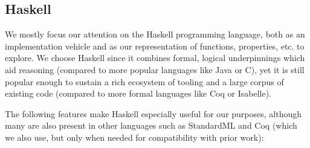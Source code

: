 \subsection{Haskell}
\label{sec:haskell}

We mostly focus our attention on the Haskell programming language, both as an
implementation vehicle and as our representation of functions, properties, etc.
to explore. We choose Haskell since it combines formal, logical underpinnings
which aid reasoning (compared to more popular languages like Java or C), yet it
is still popular enough to sustain a rich ecosystem of tooling and a large
corpus of existing code (compared to more formal languages like Coq or
Isabelle).

The following features make Haskell especially useful for our purposes, although
many are also present in other languages such as StandardML and Coq (which we
also use, but only when needed for compatibility with prior work):

